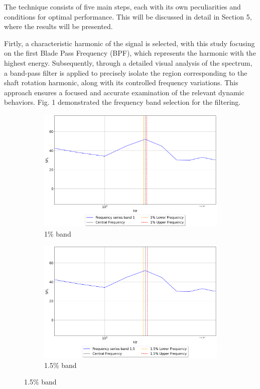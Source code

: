 \documentclass[10pt,fleqn,a4paper,twoside]{article}
\begin{document}
The technique consists of five main steps, each with its own peculiarities and conditions for optimal performance. This will be discussed in detail in Section 5, where the results will be presented.

Firtly, a characteristic harmonic of the signal is selected, with this study focusing on the first Blade Pass Frequency (BPF), which represents the harmonic with the highest energy. Subsequently, through a detailed visual analysis of the spectrum, a band-pass filter is applied to precisely isolate the region corresponding to the shaft rotation harmonic, along with its controlled frequency variations. This approach ensures a focused and accurate examination of the relevant dynamic behaviors. Fig. 1 demonstrated the frequency band selection for the filtering.
\begin{figure}[h]
\centering
\begin{subfigure}{.5\textwidth}
    \label{fig1a}
    \centering
    \includegraphics[width=0.70\linewidth]{Figures/spectra_band_1.png}
    \caption{1\% band}
    
\end{subfigure}%
\begin{subfigure}{.5\textwidth}
    \label{fig1b}
    \centering
    \includegraphics[width=0.70\linewidth]{Figures/spectra_band_1.5.png}
    \caption{1.5\% band}
    

\end{subfigure}
\end{figure}
\end{document}
